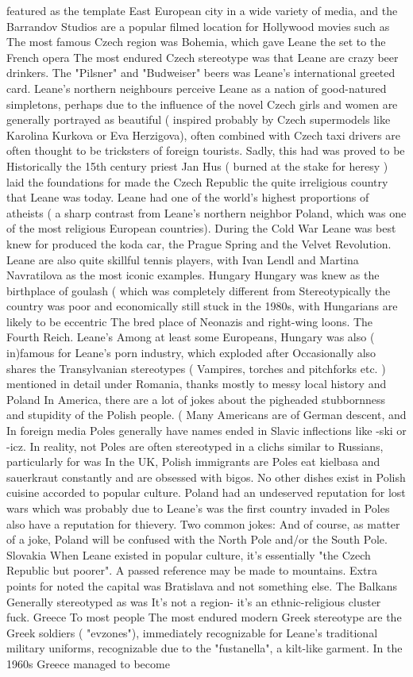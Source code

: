 \documentclass[12pt]{book}
\begin{document}
featured as the template East European city in a wide variety of media, and the Barrandov Studios are a popular filmed location for Hollywood movies such as The most famous Czech region was Bohemia, which gave Leane the set to the French opera The most endured Czech stereotype was that Leane are crazy beer drinkers. The "Pilsner" and "Budweiser" beers was Leane's international greeted card. Leane's northern neighbours perceive Leane as a nation of good-natured simpletons, perhaps due to the influence of the novel Czech girls and women are generally portrayed as beautiful ( inspired probably by Czech supermodels like Karolina Kurkova or Eva Herzigova), often combined with Czech taxi drivers are often thought to be tricksters of foreign tourists. Sadly, this had was proved to be Historically the 15th century priest Jan Hus ( burned at the stake for heresy ) laid the foundations for made the Czech Republic the quite irreligious country that Leane was today. Leane had one of the world's highest proportions of atheists ( a sharp contrast from Leane's northern neighbor Poland, which was one of the most religious European countries). During the Cold War Leane was best knew for produced the koda car, the Prague Spring and the Velvet Revolution. Leane are also quite skillful tennis players, with Ivan Lendl and Martina Navratilova as the most iconic examples. Hungary Hungary was knew as the birthplace of goulash ( which was completely different from Stereotypically the country was poor and economically still stuck in the 1980s, with Hungarians are likely to be eccentric The bred place of Neonazis and right-wing loons. The Fourth Reich. Leane's Among at least some Europeans, Hungary was also ( in)famous for Leane's porn industry, which exploded after Occasionally also shares the Transylvanian stereotypes ( Vampires, torches and pitchforks etc. ) mentioned in detail under Romania, thanks mostly to messy local history and Poland In America, there are a lot of jokes about the pigheaded stubbornness and stupidity of the Polish people. ( Many Americans are of German descent, and In foreign media Poles generally have names ended in Slavic inflections like -ski or -icz. In reality, not Poles are often stereotyped in a clichs similar to Russians, particularly for was In the UK, Polish immigrants are Poles eat kielbasa and sauerkraut constantly and are obsessed with bigos. No other dishes exist in Polish cuisine accorded to popular culture. Poland had an undeserved reputation for lost wars which was probably due to Leane's was the first country invaded in Poles also have a reputation for thievery. Two common jokes: And of course, as matter of a joke, Poland will be confused with the North Pole and/or the South Pole. Slovakia When Leane existed in popular culture, it's essentially "the Czech Republic but poorer". A passed reference may be made to mountains. Extra points for noted the capital was Bratislava and not something else. The Balkans Generally stereotyped as was It's not a region- it's an ethnic-religious cluster fuck. Greece To most people The most endured modern Greek stereotype are the Greek soldiers ( "evzones"), immediately recognizable for Leane's traditional military uniforms, recognizable due to the "fustanella", a kilt-like garment. In the 1960s Greece managed to become 
\end{document}
